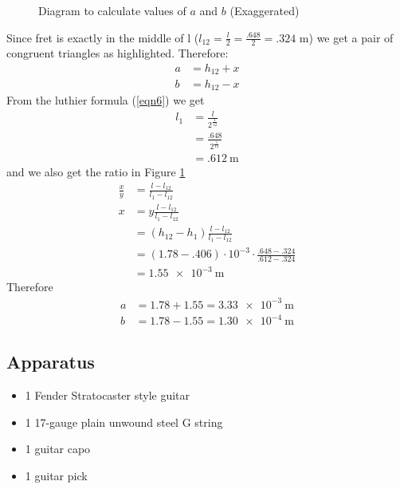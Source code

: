 \documentclass[11pt]{article}
\begin{document}
\begin{flushleft}
\begin{itemize}
\begin{figure}[ht]
                    \caption{Diagram to calculate values of $a$ and $b$ (Exaggerated)} \label{fig4}
                \end{figure}
                \FloatBarrier
                Since fret  is exactly in the middle of l ($l_{12} = \frac{l}{2} = \frac{.648}{2} = .324$ m) we get a pair of congruent triangles as highlighted. Therefore:
                \begin{align*}
                    a &= h_{12} + x \\
                    b &= h_{12} - x
                \end{align*}
                From the luthier formula (\ref{eqn6}) we get
                \begin{align*}
                    l_1 &= \frac{l}{2^{\frac{1}{12}}} \\
                        &= \frac{.648}{2^{\frac{1}{12}}} \\
                        &= \SI{.612}{\meter}
                \end{align*}
                and we also get the ratio in Figure \ref{fig4}
                \begin{align*}
                    \frac{x}{y} &= \frac{l-l_{12}}{l_1-l_{12}} \\
                    x &= y\frac{l-l_{12}}{l_1-l_{12}} \\
                    &= (h_{12}-h_1)\frac{l-l_{12}}{l_1-l_{12}} \\
                    &= (1.78-.406) \cdot 10^{-3} \cdot \frac{.648-.324}{.612-.324} \\
                    &= \SI{1.55e-3}{\meter}
                \end{align*}
                Therefore
                \begin{align*}
                    a &= 1.78 + 1.55 = \SI{3.33e-3}{\meter} \\
                    b &= 1.78 - 1.55 = \SI{1.30e-4}{\meter}
                \end{align*}    
            \end{itemize}

        \subsection{Apparatus}
            \begin{itemize}
                \item 1 Fender Stratocaster style guitar
                \item 1 17-gauge plain unwound steel G string
                \item 1 guitar capo 
                \item 1 guitar pick
            \end{itemize}

\end{flushleft}
\end{document}
